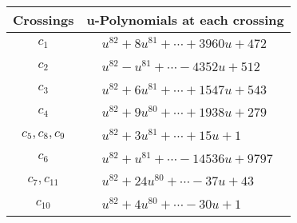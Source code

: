 \documentclass[1p]{elsarticle_modified}
\theoremstyle{definition}
\begin{document}
\begin{tabular}{m{50pt}|m{274pt}}
Crossings & \hspace{64pt}u-Polynomials at each crossing \\
\hline $$\begin{aligned}c_{1}\end{aligned}$$&$\begin{aligned}
&u^{82}+8 u^{81}+\cdots+3960 u+472
\end{aligned}$\\
\hline $$\begin{aligned}c_{2}\end{aligned}$$&$\begin{aligned}
&u^{82}- u^{81}+\cdots-4352 u+512
\end{aligned}$\\
\hline $$\begin{aligned}c_{3}\end{aligned}$$&$\begin{aligned}
&u^{82}+6 u^{81}+\cdots+1547 u+543
\end{aligned}$\\
\hline $$\begin{aligned}c_{4}\end{aligned}$$&$\begin{aligned}
&u^{82}+9 u^{80}+\cdots+1938 u+279
\end{aligned}$\\
\hline $$\begin{aligned}c_{5},c_{8},c_{9}\end{aligned}$$&$\begin{aligned}
&u^{82}+3 u^{81}+\cdots+15 u+1
\end{aligned}$\\
\hline $$\begin{aligned}c_{6}\end{aligned}$$&$\begin{aligned}
&u^{82}+u^{81}+\cdots-14536 u+9797
\end{aligned}$\\
\hline $$\begin{aligned}c_{7},c_{11}\end{aligned}$$&$\begin{aligned}
&u^{82}+24 u^{80}+\cdots-37 u+43
\end{aligned}$\\
\hline $$\begin{aligned}c_{10}\end{aligned}$$&$\begin{aligned}
&u^{82}+4 u^{80}+\cdots-30 u+1
\end{aligned}$\\
\hline
\end{tabular}\\~\\
\end{document}
